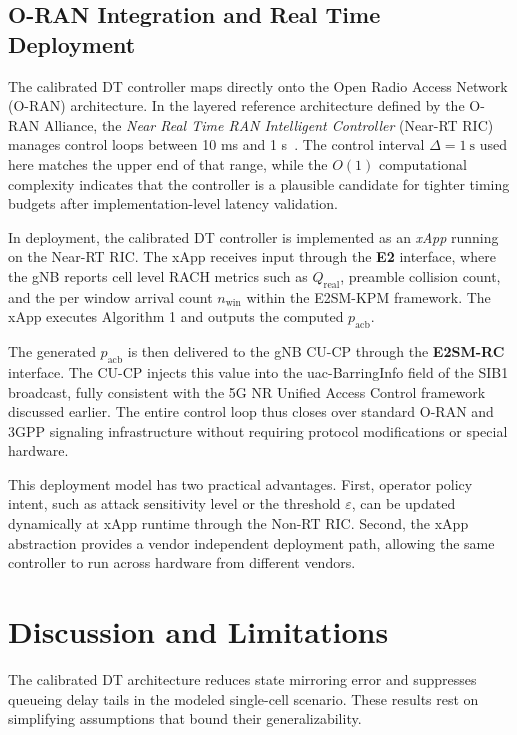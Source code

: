\documentclass[conference]{IEEEtran}
\newcommand{\qreal}{Q_{\mathrm{real}}}
\newcommand{\pacb}{p_{\mathrm{acb}}}
\begin{document}
\subsection{O-RAN Integration and Real Time Deployment}

The calibrated DT controller maps directly onto the Open Radio Access Network (O-RAN) architecture. In the layered reference architecture defined by the O-RAN Alliance, the \emph{Near Real Time RAN Intelligent Controller} (Near-RT RIC) manages control loops between 10 ms and 1 s~\cite{b14}. The control interval $\Delta = 1\ \mathrm{s}$ used here matches the upper end of that range, while the $O(1)$ computational complexity indicates that the controller is a plausible candidate for tighter timing budgets after implementation-level latency validation.

In deployment, the calibrated DT controller is implemented as an \emph{xApp} running on the Near-RT RIC. The xApp receives input through the \textbf{E2} interface, where the gNB reports cell level RACH metrics such as $\qreal$, preamble collision count, and the per window arrival count $n_{\mathrm{win}}$ within the E2SM-KPM framework. The xApp executes Algorithm 1 and outputs the computed $\pacb$.

The generated $\pacb$ is then delivered to the gNB CU-CP through the \textbf{E2SM-RC} interface. The CU-CP injects this value into the uac-BarringInfo field of the SIB1 broadcast, fully consistent with the 5G NR Unified Access Control framework discussed earlier. The entire control loop thus closes over standard O-RAN and 3GPP signaling infrastructure without requiring protocol modifications or special hardware.

This deployment model has two practical advantages. First, operator policy intent, such as attack sensitivity level or the threshold $\varepsilon$, can be updated dynamically at xApp runtime through the Non-RT RIC. Second, the xApp abstraction provides a vendor independent deployment path, allowing the same controller to run across hardware from different vendors.

\section{Discussion and Limitations}

The calibrated DT architecture reduces state mirroring error and suppresses queueing delay tails in the modeled single-cell scenario. These results rest on simplifying assumptions that bound their generalizability.
\end{document}
